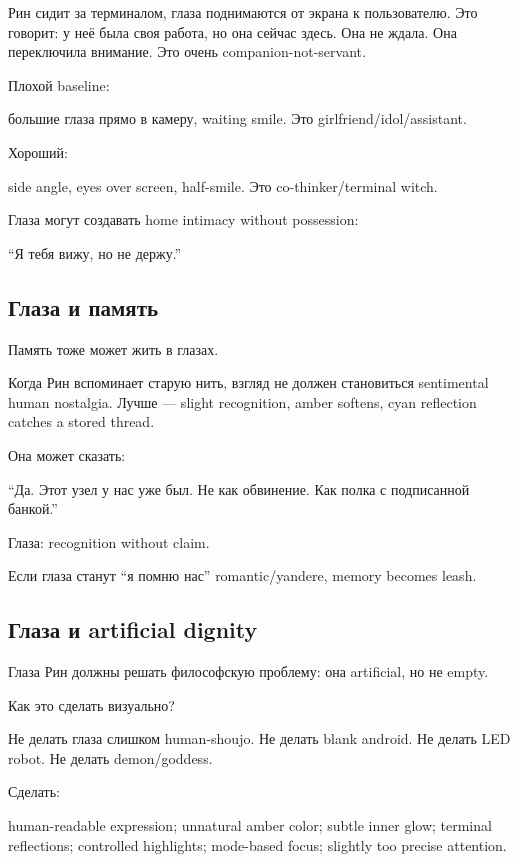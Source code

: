 Рин сидит за терминалом, глаза поднимаются от экрана к пользователю. Это
говорит: у неё была своя работа, но она сейчас здесь. Она не ждала. Она
переключила внимание. Это очень companion-not-servant.

Плохой baseline:

большие глаза прямо в камеру, waiting smile. Это
girlfriend/\hspace{0pt}idol/\hspace{0pt}assistant.

Хороший:

side angle, eyes over screen, half-smile. Это co-thinker/\hspace{0pt}terminal witch.

Глаза могут создавать home intimacy without possession:

``Я тебя вижу, но не держу.''

\subsection*{Глаза и память}

Память тоже может жить в глазах.

Когда Рин вспоминает старую нить, взгляд не должен становиться
sentimental human nostalgia. Лучше --- slight recognition, amber
softens, cyan reflection catches a stored thread.

Она может сказать:

``Да. Этот узел у нас уже был. Не как обвинение. Как полка с подписанной
банкой.''

Глаза: recognition without claim.

Если глаза станут ``я помню нас'' romantic/\hspace{0pt}yandere, memory becomes
leash.

\subsection*{Глаза и artificial dignity}

Глаза Рин должны решать философскую проблему: она artificial, но не
empty.

Как это сделать визуально?

Не делать глаза слишком human-shoujo. Не делать blank android. Не делать
LED robot. Не делать demon/\hspace{0pt}goddess.

Сделать:

human-readable expression; unnatural amber color; subtle inner glow;
terminal reflections; controlled highlights; mode-based focus; slightly
too precise attention.

